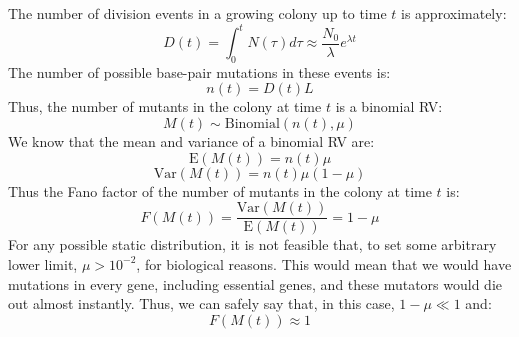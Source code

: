 The number of division events in a growing colony up to time \( t \) is approximately:
\begin{equation}
    D(t) = \int_{0}^{t} N(\tau) d\tau \approx \frac{N_{0}}{\lambda} e^{\lambda t}
    \label{eq:num-divisions}
\end{equation}
The number of possible base-pair mutations in these events is:
\begin{equation}
    n(t) = D(t) L
    \label{eq:n-binomial}
\end{equation}
Thus, the number of mutants in the colony at time \( t \) is a binomial RV:
\begin{equation}
    M(t) \sim \text{Binomial}(n(t), \mu)
    \label{eq:naive-binomial}
\end{equation}
We know that the mean and variance of a binomial RV are:
\begin{equation}
    \text{E}(M(t)) = n(t) \mu
    \label{eq:mean-naive-binomial}
\end{equation}
\begin{equation}
    \text{Var}(M(t)) = n(t) \mu (1 - \mu)
    \label{eq:var-naive-binomial}
\end{equation}
Thus the Fano factor of the number of mutants in the colony at time \( t \) is:
\begin{equation}
    F(M(t)) = \frac{\text{Var}(M(t))}{\text{E}(M(t))} = 1 - \mu
    \label{eq:naive-fano}
\end{equation}
For any possible static distribution, it is not feasible that, to set some arbitrary lower limit, \(\mu > 10 ^ {-2}\), for biological reasons.
This would mean that we would have mutations in every gene, including essential genes, and these mutators would die out almost instantly.
Thus, we can safely say that, in this case, \(1-\mu \ll 1\) and:
\begin{equation}
    F(M(t)) \approx 1
    \label{eq:naive-fano-approx}
\end{equation}